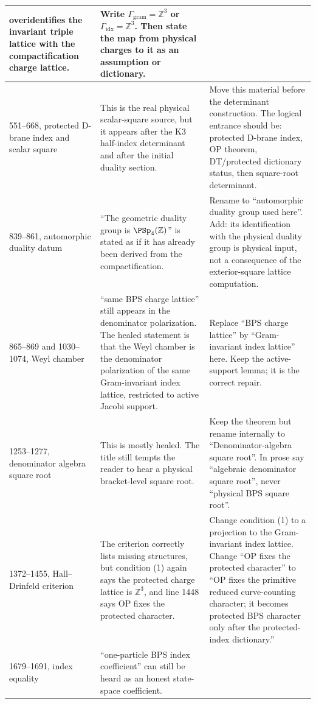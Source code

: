 \begin{center}
\begin{tabular}{p{}|p{}|p{}}
overidentifies the invariant triple lattice with the compactification
charge lattice.&
Write \(\Gamma_{\mathrm{gram}}=\mathbb Z^3\) or
\(\Gamma_{\mathrm{idx}}=\mathbb Z^3\).  Then state the map from physical
charges to it as an assumption or dictionary.\\ \hline
551--668, protected D-brane index and scalar square&
This is the real physical scalar-square source, but it appears after the
K3 half-index determinant and after the initial duality section.&
Move this material before the determinant construction.  The logical
entrance should be: protected D-brane index, OP theorem, DT/protected
dictionary status, then square-root determinant.\\ \hline
839--861, automorphic duality datum&
``The geometric duality group is \(\PSp_4(\mathbb Z)\)'' is stated as
if it has already been derived from the compactification.&
Rename to ``automorphic duality group used here''.  Add: its
identification with the physical duality group is physical input, not a
consequence of the exterior-square lattice computation.\\ \hline
865--869 and 1030--1074, Weyl chamber&
``same BPS charge lattice'' still appears in the denominator
polarization.  The healed statement is that the Weyl chamber is the
denominator polarization of the same Gram-invariant index lattice,
restricted to active Jacobi support.&
Replace ``BPS charge lattice'' by ``Gram-invariant index lattice'' here.
Keep the active-support lemma; it is the correct repair.\\ \hline
1253--1277, denominator algebra square root&
This is mostly healed.  The title still tempts the reader to hear a
physical bracket-level square root.&
Keep the theorem but rename internally to ``Denominator-algebra square
root''.  In prose say ``algebraic denominator square root'', never
``physical BPS square root''.\\ \hline
1372--1455, Hall--Drinfeld criterion&
The criterion correctly lists missing structures, but condition (1)
again says the protected charge lattice is \(\mathbb Z^3\), and line
1448 says OP fixes the protected character.&
Change condition (1) to a projection to the Gram-invariant index lattice.
Change ``OP fixes the protected character'' to ``OP fixes the primitive
reduced curve-counting character; it becomes protected BPS character only
after the protected-index dictionary.''\\ \hline
1679--1691, index equality&
``one-particle BPS index coefficient'' can still be heard as an honest
state-space coefficient.&

\end{tabular}
\end{center}
